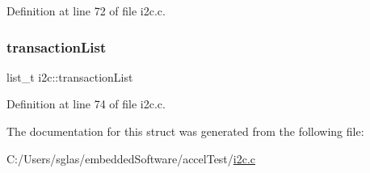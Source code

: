 Definition at line 72 of file i2c.\+c.

\mbox{\label{structi2c_a0b6b540801803c2a7147c38f7c5d47d3}} 
\subsubsection{\texorpdfstring{transactionList}{transactionList}}
{\footnotesize\ttfamily list\+\_\+t i2c\+::transaction\+List}



Definition at line 74 of file i2c.\+c.



The documentation for this struct was generated from the following file\+:\begin{DoxyCompactItemize}
\item 
C\+:/\+Users/sglas/embedded\+Software/accel\+Test/\mbox{\hyperlink{i2c_8c}{i2c.\+c}}\end{DoxyCompactItemize}
